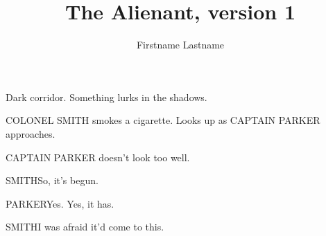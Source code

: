 \documentclass{screenplay}
\title{The Alienant, version 1}
\author{Firstname Lastname}
\begin{document}
\coverpage
\fadein
{}

Dark corridor. Something lurks in the shadows.


COLONEL SMITH smokes a cigarette. Looks up as CAPTAIN PARKER approaches.

CAPTAIN PARKER doesn't look too well.

\begin{dialogue}{SMITH}So, it's begun.\end{dialogue}

\begin{dialogue}{PARKER}Yes.  Yes, it has.\end{dialogue}

\begin{dialogue}{SMITH}I was afraid it'd come to this.\end{dialogue}

\fadeout
\theend
\end{document}

